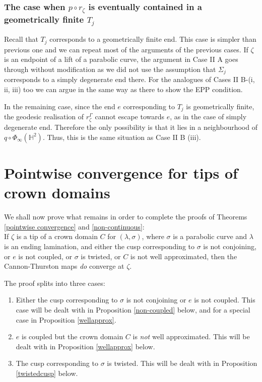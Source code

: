\documentclass{amsart}
\theoremstyle{definition}
\newcommand\HHH{{\mathbb H}}
\begin{document}
\subsubsection{The case when $p \circ r_\zeta$ is eventually contained in a geometrically finite $T_j$} Recall that $T_j$ corresponds to a geometrically finite end.
This case is simpler than previous one and we can repeat most of the arguments of the previous cases.
If $\zeta$ is an endpoint of a lift of a parabolic curve,  the argument in Case II A goes through without modification as
we did not use the assumption that $\Sigma_j$ corresponds to a simply degenerate end there.
For the analogues of Cases II B-(i, ii, iii) too we can argue in the same way as there to show the EPP condition.

In the remaining case, since the end $e$ corresponding to $T_j$ is geometrically finite, the geodesic realisation of $r_\zeta^\Gamma$ cannot escape towards $e$, as in the case of simply degenerate end.
Therefore the only possibility is that it lies in a neighbourhood of $q \circ \Phi_\infty(\HHH^2)$.
Thus, this is the same situation as Case II B (iii).

\section{Pointwise convergence for tips of crown domains}
\label{crowntips}
We shall now prove what remains in order to complete the proofs of Theorems \ref{pointwise convergence} and \ref{non-continuous}: \\
\noindent 
If $\zeta$ is a tip of a crown domain $C$ for $(\lambda, \sigma)$, where $\sigma$ is a parabolic curve and $\lambda$ is an ending lamination,  and either the cusp corresponding to $\sigma$ is not conjoining, or $e$ is not coupled, or $\sigma$ is twisted, or $C$ is not well approximated, then the Cannon-Thurston maps {\em do} converge at $\zeta$.
 
 The proof splits into three cases:
 \begin{enumerate}
 	\item Either the cusp corresponding to $\sigma$ is not conjoining or $e$ is not coupled. This case will be dealt with in Proposition \ref{non-coupled} below, and for a special case in Proposition \ref{wellapprox}. 
	\item $e$ is coupled but the crown domain $C$ is {\it not} well approximated. 	This will be dealt with in Proposition \ref{wellapprox} below.
\item The cusp corresponding to $\sigma$ is twisted.
 	This will be dealt with in Proposition \ref{twistedcusp} below. 
 	 \end{enumerate}
 
\end{document}
